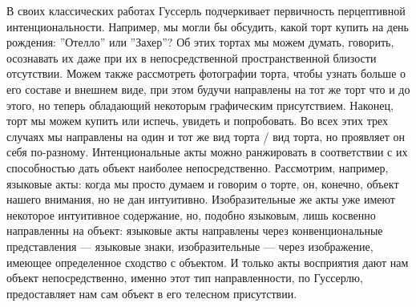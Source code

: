 \documentclass[11pt]{book}
\begin{document}
В своих классических работах Гуссерль подчеркивает первичность перцептивной интенциональности. Например, мы могли бы обсудить, какой торт купить на день рождения: ''Отелло'' или ''Захер''? Об этих тортах мы можем думать, говорить, осознавать их даже при их в непосредственной пространственной близости отсутствии. Можем также рассмотреть фотографии торта, чтобы узнать больше о его составе и внешнем виде, при этом будучи направлены на тот же торт что и до этого, но теперь обладающий некоторым графическим присутствием. Наконец, торт мы можем купить или испечь, увидеть и попробовать. Во всех этих трех случаях мы направлены на один и тот же вид торта / вид торта, но проявляет он себя по-разному. Интенциональные акты можно ранжировать в соответствии с их способностью дать объект наиболее непосредственно. Рассмотрим, например, языковые акты: когда мы просто думаем и говорим о торте, он, конечно, объект нашего внимания, но не дан интуитивно. Изобразительные же акты уже имеют некоторое интуитивное содержание, но, подобно языковым, лишь косвенно направленны на объект: языковые акты направлены через конвенциональные представления --- языковые знаки, изобразительные --- через изображение, имеющее определенное сходство с объектом. И только акты восприятия дают нам объект непосредственно, именно этот тип направленности, по Гуссерлю, предоставляет нам сам объект в его телесном присутствии.
\end{document}
